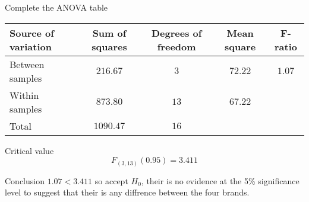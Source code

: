 \begin{example}
        \begin{step}{Complete the ANOVA table}
        \begin{center}
        \begin{tabular}{l|c|c|c|c}
        Source of variation & Sum of squares    & Degrees of freedom    & Mean square   & F-ratio   \\
        \hline
        Between samples     & $216.67$          & $3$                   & $72.22$       & $1.07$    \\
        Within samples      & $873.80$          & $13$                  & $67.22$       &           \\
        \hline
        Total               & $1090.47$         & $16$                  &               &           \\
        \end{tabular}
        \end{center}
        \end{step}

        \begin{step}{Critical value}
        $$
        F_{(3, 13)}(0.95) = 3.411 
        $$
        \end{step}

        \begin{step}{Conclusion}
        $1.07 < 3.411$ so accept $H_0$, their is no evidence at the 5\% significance level to suggest that their is any diffrence between the four brands.
        \end{step}
        \end{example}


